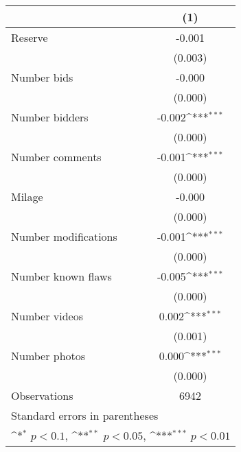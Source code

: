 {
\def\sym#1{\ifmmode^{#1}\else\(^{#1}\)\fi}
\begin{tabular}{l*{1}{c}}
\hline\hline
                    &\multicolumn{1}{c}{(1)}         \\
\hline
Reserve             &      -0.001         \\
                    &     (0.003)         \\
[1em]
Number bids         &      -0.000         \\
                    &     (0.000)         \\
[1em]
Number bidders      &      -0.002\sym{***}\\
                    &     (0.000)         \\
[1em]
Number comments     &      -0.001\sym{***}\\
                    &     (0.000)         \\
[1em]
Milage              &      -0.000         \\
                    &     (0.000)         \\
[1em]
Number modifications&      -0.001\sym{***}\\
                    &     (0.000)         \\
[1em]
Number known flaws  &      -0.005\sym{***}\\
                    &     (0.000)         \\
[1em]
Number videos       &       0.002\sym{***}\\
                    &     (0.001)         \\
[1em]
Number photos       &       0.000\sym{***}\\
                    &     (0.000)         \\
\hline
Observations        &        6942         \\
\hline\hline
\multicolumn{2}{l}{\footnotesize Standard errors in parentheses}\\
\multicolumn{2}{l}{\footnotesize \sym{*} \(p<0.1\), \sym{**} \(p<0.05\), \sym{***} \(p<0.01\)}\\
\end{tabular}
}
